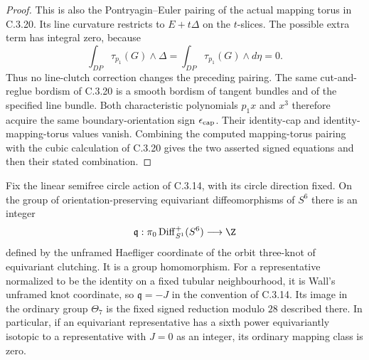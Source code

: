 \begin{proof}
This is also the Pontryagin--Euler pairing of the actual
mapping torus in C.3.20. Its line curvature restricts to
$E+t\Delta$ on the $t$-slices. The possible extra term
has integral zero, because
\[
 \int_{DP}\tau_{p_1}(G)\wedge\Delta
 =\int_{DP}\tau_{p_1}(G)\wedge d\eta=0.
\]
Thus no line-clutch correction changes the preceding
pairing. The same cut-and-reglue bordism of C.3.20 is a
smooth bordism of tangent bundles and of the specified
line bundle. Both characteristic polynomials $p_1x$
and $x^3$ therefore acquire the same boundary-orientation
sign $\epsilon_{\rm cap}$. Their identity-cap and
identity-mapping-torus values vanish. Combining the
computed mapping-torus pairing with the cubic calculation
of C.3.20 gives the two asserted signed equations and
then their stated combination.
\end{proof}
\begin{proposition}
Fix the linear semifree circle action of C.3.14, with its
circle direction fixed. On the group of orientation-preserving
equivariant diffeomorphisms of $S^6$ there is an integer
\[
 \mathfrak q:\pi_0\operatorname{Diff}^+_{S^1}(S^6)
                    \longrightarrow\Z
\]
defined by the unframed Haefliger coordinate of the orbit
three-knot of equivariant clutching. It is a group homomorphism.
For a representative normalized to be the identity on a fixed
tubular neighbourhood, it is Wall's unframed knot coordinate,
so $\mathfrak q=-J$ in the convention of C.3.14. Its image in
the ordinary group $\Theta_7$ is the fixed signed reduction
modulo $28$ described there. In particular, if an equivariant
representative has a sixth power equivariantly isotopic to a
representative with $J=0$ as an integer, its ordinary mapping
class is zero.
\end{proposition}
